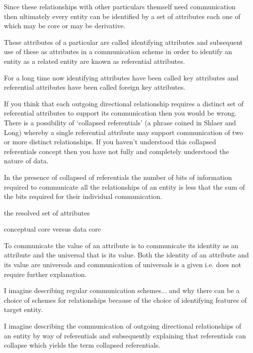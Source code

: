 \mynote Since these relationships with other particulars themself need communication then ultimately every entity can be identified by a set of attributes each one of which may be core or may be derivative.  

\mynote
These attributes of a particular are called identifying attributes and subsequent use of these as attributes in a communication scheme in order to identify an entity as a related entity are known as referential attributes. 

\mynote For a long time now identifying attributes have been called key attributes and referential attributes have been called foreign key attributes. 

\mynote If you think that each outgoing directional relationship requires a distinct set of referential attributes to support its communication then you would be wrong. 
There is a possibility of `collapsed referentials' (a phrase coined in Shlaer and Long) whereby a single referential attribute may support communication of two or more distinct relationships. If you haven't understood this collapsed referentials concept then you have not  fully and completely understood the nature of data. 

\mynote In the presence of collapsed of referentials the number of bits of information required to communicate all the relationships of an entity is less that the sum of the bits required for their individual communication. 

\mynote the resolved set of attributes

\mynote conceptual core versus data core

\begin{oldtt}
\mynote To communicate the value of an attribute is to communicate its identity as an attribute and the universal that is its value. Both the identity of an attribute and its value are universals and communication of universals is a given i.e. does not require further explanation. 
\end{oldtt}

\begin{noteforfuture}
I imagine describing regular communication schemes... and why there can be a choice of schemes for relationships because of the choice of identifying features of target entity. 
\end{noteforfuture}
\begin{noteforfuture}
I imagine describing the communication of outgoing directional relationships of an entity by way of referentials and subsequently explaining that referentials can collapse which yields the term collapsed referentials.
\end{noteforfuture}